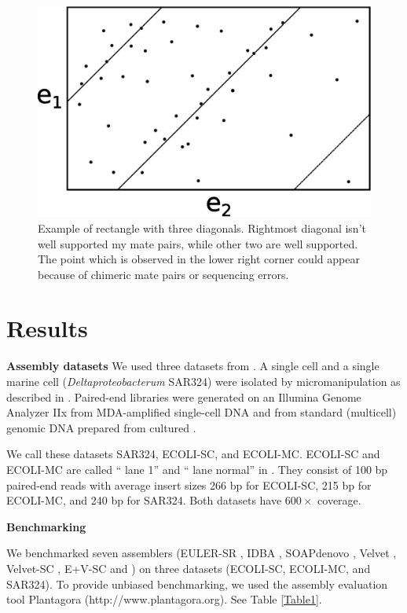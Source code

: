 \begin{figure}
\begin{center}
\includegraphics[scale=0.5]{fig/rectangle.eps}
\caption{Example of rectangle with three diagonals. Rightmost diagonal isn't well supported my mate pairs, while other two are well supported. The point which is observed in the lower right corner could appear because of chimeric mate pairs or sequencing errors.}
\end{center}
\end{figure}


\section{Results}

\textbf{Assembly datasets}
%
We used three datasets from \cite{Chitsaz2011}.
A single {\ecoli} cell
and a single marine cell ({\em Deltaproteobacterum} SAR324)
were isolated by micromanipulation as described in \cite{Ishoey2008}.
Paired-end libraries were generated on an Illumina Genome Analyzer IIx from MDA-amplified single-cell DNA
and
from standard (multicell) genomic DNA prepared from cultured {\ecoli}.

We call these datasets SAR324, ECOLI-SC, and ECOLI-MC.
ECOLI-SC and ECOLI-MC are called ``{\ecoli} lane 1'' and ``{\ecoli} lane normal'' in \cite{Chitsaz2011}.
They consist of 100 bp paired-end reads
with average insert sizes 266 bp for ECOLI-SC, 215 bp for ECOLI-MC,
and 240 bp for SAR324.
Both datasets have $600\times$ coverage.

\textbf{Benchmarking}

We benchmarked seven assemblers
(EULER-SR \cite{Chaisson08}, IDBA \cite{Peng10}, SOAPdenovo \cite{Li10}, Velvet \cite{Zerbino08}, Velvet-SC \cite{Chitsaz2011}, E+V-SC \cite{Chitsaz2011} and {\spades}) on three datasets
(ECOLI-SC, ECOLI-MC, and SAR324). To provide unbiased
benchmarking, we used the assembly evaluation tool Plantagora (http://www.plantagora.org). See Table \ref{Table1}.


